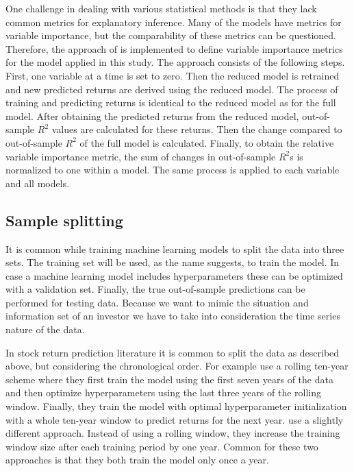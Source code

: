 \documentclass[12pt]{article}
\begin{document}
One challenge in dealing with various statistical methods is that they lack common metrics for explanatory inference. Many of the models have metrics for variable importance, but the comparability of these metrics can be questioned. Therefore, the approach of \citet{guetal} is implemented to define variable importance metrics for the model applied in this study. The approach consists of the following steps. First, one variable at a time is set to zero. Then the reduced model is retrained and new predicted returns are derived using the reduced model. The process of training and predicting returns is identical to the reduced model as for the full model. After obtaining the predicted returns from the reduced model, out-of-sample $R^2$ values are calculated for these returns. Then the change compared to out-of-sample $R^2$ of the full model is calculated. Finally, to obtain the relative variable importance metric, the sum of changes in out-of-sample $R^2$s is normalized to one within a model. The same process is applied to each variable and all models.\footnotemark {} \par

\subsection{Sample splitting} \label{SampleSplitting}

It is common while training machine learning models to split the data into three sets. The training set will be used, as the name suggests, to train the model. In case a machine learning model includes hyperparameters these can be optimized with a validation set. Finally, the true out-of-sample predictions can be performed for testing data. Because we want to mimic the situation and information set of an investor we have to take into consideration the time series nature of the data. \par

In stock return prediction literature it is common to split the data as described above, but considering the chronological order. For example \citet{Fieberg} use a rolling ten-year scheme where they first train the model using the first seven years of the data and then optimize hyperparameters using the last three years of the rolling window.\footnotemark {} Finally, they train the model with optimal hyperparameter initialization with a whole ten-year window to predict returns for the next year. \citet{guetal} use a slightly different approach. Instead of using a rolling window, they increase the training window size after each training period by one year.\footnotemark {} Common for these two approaches is that they both train the model only once a year. \par
\end{document}
